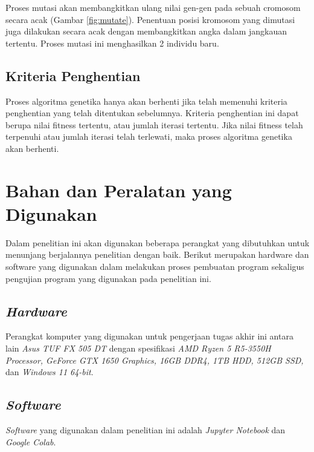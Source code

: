   Proses mutasi akan membangkitkan ulang nilai gen-gen pada sebuah cromosom secara acak (Gambar \ref{fig:mutate}). Penentuan posisi kromosom yang dimutasi juga dilakukan secara acak dengan membangkitkan angka dalam jangkauan tertentu. 
  Proses mutasi ini menghasilkan 2 individu baru.
  \subsection{Kriteria Penghentian}
  
  Proses algoritma genetika hanya akan berhenti jika telah memenuhi kriteria penghentian yang telah ditentukan sebelumnya. 
  Kriteria penghentian ini dapat berupa nilai fitness tertentu, atau jumlah iterasi tertentu. 
  Jika nilai fitness telah terpenuhi atau jumlah iterasi telah terlewati, maka proses algoritma genetika akan berhenti.

\section{Bahan dan Peralatan yang Digunakan}
Dalam penelitian ini akan digunakan beberapa perangkat yang dibutuhkan untuk menunjang berjalannya penelitian dengan baik.
Berikut merupakan hardware dan software yang digunakan dalam melakukan proses pembuatan program sekaligus pengujian program yang digunakan pada penelitian ini.
\subsection{\emph{Hardware}}
Perangkat komputer yang digunakan untuk pengerjaan tugas akhir ini antara lain \emph{Asus TUF FX 505 DT} dengan spesifikasi \emph{AMD Ryzen 5 R5-3550H Processor, GeForce GTX 1650 Graphics, 16GB DDR4, 1TB HDD, 512GB SSD,} dan \emph{Windows 11 64-bit}.
\subsection{\emph{Software}}
\emph{Software} yang digunakan dalam penelitian ini adalah \emph{Jupyter Notebook} dan \emph{Google Colab}.


